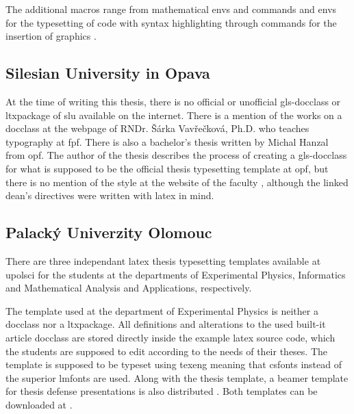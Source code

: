     The additional macros range from mathematical \glspl{env} \cite[section~3.5]{diploma} and commands and \glspl{env} for the typesetting of code with syntax highlighting \cite[section~3.6]{diploma} \pending{} through commands for the insertion of graphics \cite[section~3.7]{diploma}.

    \subsection{Silesian University in Opava}
    At the time of writing this thesis, there is no official or unofficial \gls{gls-docclass} or \gls{ltxpackage} of \gls{slu} available on the internet. There is a mention \cite{vavreckova} of the works on a \gls{docclass} at the webpage of RNDr. Šárka Vavřečková, Ph.D. who teaches typography at \acrlong{fpf}. There is also a bachelor's thesis \cite{hanzal09} written by Michal Hanzal from \gls{opf}. The author of the thesis describes the process of creating a \gls{gls-docclass} for what is supposed to be the official thesis typesetting template at \gls{opf}, but there is no mention of the style at the website of the faculty \cite{opftemplates}, although the linked dean's directives were written with \gls{latex} in mind.

    \subsection{Palacký Univerzity Olomouc}
    There are three independant \gls{latex} thesis typesetting templates available at \acrlong{upolsci} for the students at the departments of Experimental Physics, Informatics and Mathematical Analysis and Applications, respectively.

    The template used at the department of Experimental Physics is neither a \gls{docclass} nor a \gls{ltxpackage}. All definitions and alterations to the used built-it article \gls{docclass} are stored directly inside the example \gls{latex} source code, which the students are supposed to edit according to the needs of their theses. The template is supposed to be typeset using  \gls{texeng} meaning that \gls{csfonts} instead of the superior \gls{lmfonts} are used. Along with the thesis template, a \gls{beamer} template for thesis defense presentations is also distributed \pending{}. Both templates can be downloaded at \cite{upol-exfyz-template}.

